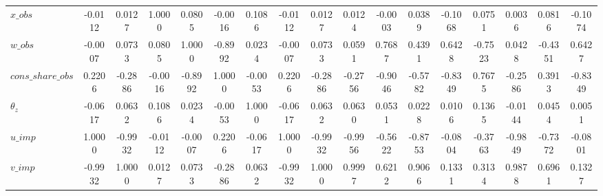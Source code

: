 \begin{center}
\begin{longtable}{lcccccccccccccccc}
$x\_obs             $	 & 	              -0.0112	 & 	               0.0127	 & 	               1.0000	 & 	               0.0805	 & 	              -0.0016	 & 	               0.1086	 & 	              -0.0112	 & 	               0.0127	 & 	               0.0124	 & 	              -0.0003	 & 	               0.0389	 & 	              -0.1068	 & 	               0.0751	 & 	               0.0036	 & 	               0.0816	 & 	              -0.1074 \\ 
$w\_obs             $	 & 	              -0.0007	 & 	               0.0733	 & 	               0.0805	 & 	               1.0000	 & 	              -0.8992	 & 	               0.0234	 & 	              -0.0007	 & 	               0.0733	 & 	               0.0591	 & 	               0.7687	 & 	               0.4391	 & 	               0.6428	 & 	              -0.7523	 & 	               0.0428	 & 	              -0.4351	 & 	               0.6427 \\ 
$cons\_share\_obs   $	 & 	               0.2206	 & 	              -0.2886	 & 	              -0.0016	 & 	              -0.8992	 & 	               1.0000	 & 	              -0.0053	 & 	               0.2206	 & 	              -0.2886	 & 	              -0.2756	 & 	              -0.9046	 & 	              -0.5782	 & 	              -0.8349	 & 	               0.7675	 & 	              -0.2586	 & 	               0.3913	 & 	              -0.8349 \\ 
${\theta_z}         $	 & 	              -0.0617	 & 	               0.0632	 & 	               0.1086	 & 	               0.0234	 & 	              -0.0053	 & 	               1.0000	 & 	              -0.0617	 & 	               0.0632	 & 	               0.0630	 & 	               0.0531	 & 	               0.0228	 & 	               0.0106	 & 	               0.1365	 & 	              -0.0144	 & 	               0.0454	 & 	               0.0051 \\ 
$u\_imp             $	 & 	               1.0000	 & 	              -0.9932	 & 	              -0.0112	 & 	              -0.0007	 & 	               0.2206	 & 	              -0.0617	 & 	               1.0000	 & 	              -0.9932	 & 	              -0.9956	 & 	              -0.5622	 & 	              -0.8753	 & 	              -0.0804	 & 	              -0.3763	 & 	              -0.9849	 & 	              -0.7372	 & 	              -0.0801 \\ 
$v\_imp             $	 & 	              -0.9932	 & 	               1.0000	 & 	               0.0127	 & 	               0.0733	 & 	              -0.2886	 & 	               0.0632	 & 	              -0.9932	 & 	               1.0000	 & 	               0.9997	 & 	               0.6212	 & 	               0.9066	 & 	               0.1331	 & 	               0.3134	 & 	               0.9878	 & 	               0.6961	 & 	               0.1327 \\ 

\end{longtable}
\end{center}
